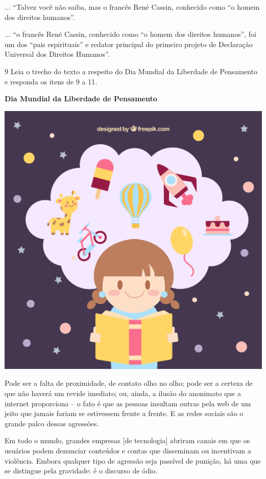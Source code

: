 \begin{conteudo}
\begin{conteudo}
\begin{conteudo}
\begin{conteudo}
\begin{conteudo}
\begin{boxlist}
 ... ``Talvez você não saiba, mas o francês René Cassin,
conhecido como ``o homem dos direitos humanos''.

 ... ``o francês René Cassin, conhecido como ``o homem 
dos direitos humanos'', foi um dos ``pais espirituais'' e redator principal do
primeiro projeto de Declaração Universal dos Direitos Humanos''.
\end{boxlist}

\num{9} Leia o trecho do texto a respeito do Dia Mundial da Liberdade de
Pensamento e responda os itens de 9 a 11.

\begin{myquote}
\textbf{Dia Mundial da Liberdade de Pensamento}

\begin{center}
\includegraphics[width=\textwidth]{media/image28a.jpeg}
\end{center}

Pode ser a falta de proximidade, de contato olho no olho; pode ser a
certeza de que não haverá um revide imediato; ou, ainda, a ilusão do
anonimato que a internet proporciona -- o fato é que as pessoas insultam
outras pela web de um jeito que jamais fariam se estivessem frente a
frente. E as redes sociais são o grande palco dessas agressões.

Em todo o mundo, grandes empresas [de tecnologia]
abriram canais em que os usuários podem denunciar conteúdos e contas que
disseminam ou incentivam a violência. Embora qualquer tipo de agressão
seja passível de punição, há uma que se distingue pela gravidade: é o
discurso de ódio.


\end{myquote}
\end{conteudo}
\end{conteudo}
\end{conteudo}
\end{conteudo}
\end{conteudo}
